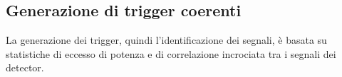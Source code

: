 %
%
\subsection{Generazione di trigger coerenti}
\label{section:coherent_trigger}
La generazione dei trigger, quindi l'identificazione dei segnali, è basata su statistiche di eccesso di potenza e di correlazione incrociata tra i segnali dei detector. 


